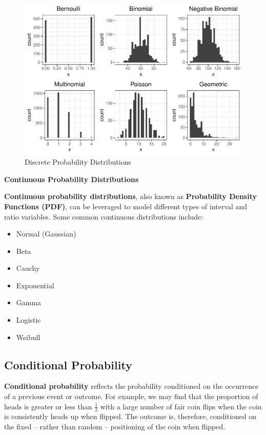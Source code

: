 \documentclass[]{book}
\providecommand{\tightlist}{%
  \setlength{\itemsep}{0pt}\setlength{\parskip}{0pt}}
\begin{document}
\begin{figure}

{\centering \includegraphics{_main_files/figure-latex/discrete-dist-1} 

}

\caption{Discrete Probability Distributions}\label{fig:discrete-dist}
\end{figure}

\textbf{Continuous Probability Distributions}

\textbf{Continuous probability distributions}, also known as \textbf{Probability Density Functions (PDF)}, can be leveraged to model different types of interval and ratio variables. Some common continuous distributions include:

\begin{itemize}
\tightlist
\item
  Normal (Gaussian)
\item
  Beta
\item
  Cauchy
\item
  Exponential
\item
  Gamma
\item
  Logistic
\item
  Weibull
\end{itemize}

\hypertarget{conditional-probability}{%
\subsection{Conditional Probability}\label{conditional-probability}}

\textbf{Conditional probability} reflects the probability conditioned on the occurrence of a previous event or outcome. For example, we may find that the proportion of heads is greater or less than \(\frac{1}{2}\) with a large number of fair coin flips when the coin is consistently heads up when flipped. The outcome is, therefore, conditioned on the fixed -- rather than random -- positioning of the coin when flipped.
\end{document}
